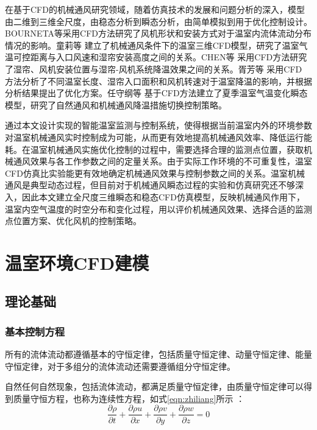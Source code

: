 在基于CFD的机械通风研究领域，随着仿真技术的发展和问题分析的深入，模型由二维到三维全尺度，由稳态分析到瞬态分析，由简单模拟到用于优化控制设计。BOURNETA等\supercite{Bournet2010}采用CFD方法研究了风机形状和安装方式对于温室内流体流动分布情况的影响。童莉等\supercite{TongLi2003} 建立了机械通风条件下的温室三维CFD模型，研究了温室气温可控距离与入口风速和湿帘安装高度之间的关系。CHEN等\supercite{Chen2014} 采用CFD方法研究了湿帘、风机安装位置与湿帘-风机系统降温效果之间的关系。胥芳等\supercite{XuFang2015} 采用CFD 方法分析了不同温室长度、湿帘入口面积和风机转速对于温室降温的影响，并根据分析结果提出了优化方案。任守纲等\supercite{RenShougang2015} 基于CFD方法建立了夏季温室气温变化瞬态模型，研究了自然通风和机械通风降温措施切换控制策略。

通过本文设计实现的智能温室监测与控制系统，使得根据当前温室内外的环境参数对温室机械通风实时控制成为可能，从而更有效地提高机械通风效率、降低运行能耗。在温室机械通风实施优化控制的过程中，需要选择合理的监测点位置，获取机械通风效果与各工作参数之间的定量关系。由于实际工作环境的不可重复性，温室CFD仿真比实验能更有效地确定机械通风效果与控制参数之间的关系。温室机械通风是典型动态过程，但目前对于机械通风瞬态过程的实验和仿真研究还不够深入，因此本文建立全尺度三维瞬态和稳态CFD仿真模型，反映机械通风作用下，温室内空气温度的时空分布和变化过程，用以评价机械通风效果、选择合适的监测点位置方案、优化风机的控制策略。


\section{温室环境CFD建模}
	\subsection{理论基础}
		\subsubsection{基本控制方程}
所有的流体流动都遵循基本的守恒定律，包括质量守恒定律、动量守恒定律、能量守恒定律，对于多组分的流体流动还需要遵循组分守恒定律。

自然任何自然现象，包括流体流动，都满足质量守恒定律，由质量守恒定律可以得到质量守恒方程，也称为连续性方程，如式\ref{eqn:zhiliang}所示\supercite{ComsolCfd2015,WangFujun2004} ：
	\begin{equation}
		\label{eqn:zhiliang}
		\frac{\partial\rho}{\partial t}+\frac{\partial \rho u}{\partial x}+\frac{\partial \rho v}{\partial y}+\frac{\partial \rho w}{\partial z}=0
	\end{equation}

